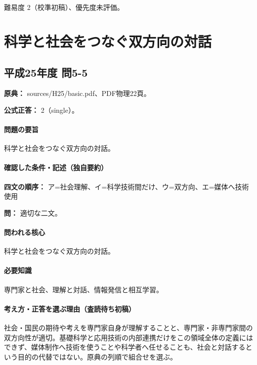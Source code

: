 \par 難易度 2（校準初稿）、優先度未評価。

\section{科学と社会をつなぐ双方向の対話}

\subsection{平成25年度 問5-5}
\label{q:h25-reg-basic-5-5}

\noindent\textbf{原典：} sources/H25/basic.pdf、PDF物理22頁。

\textbf{公式正答：} 2（single）。

\paragraph{問題の要旨} 科学と社会をつなぐ双方向の対話。

\paragraph{確認した条件・記述（独自要約）}\mbox{}\par

\noindent\textbf{四文の順序：} ア=社会理解、イ=科学技術間だけ、ウ=双方向、エ=媒体へ技術使用\par

\noindent\textbf{問：} 適切な二文。\par

\paragraph{問われる核心} 科学と社会をつなぐ双方向の対話。

\paragraph{必要知識} 専門家と社会、理解と対話、情報発信と相互学習。

\paragraph{考え方・正答を選ぶ理由（査読待ち初稿）} 社会・国民の期待や考えを専門家自身が理解することと、専門家・非専門家間の双方向性が適切。基礎科学と応用技術の内部連携だけをこの領域全体の定義にはできず、媒体制作へ技術を使うことや科学者へ任せることも、社会と対話するという目的の代替ではない。原典の列順で組合せを選ぶ。

